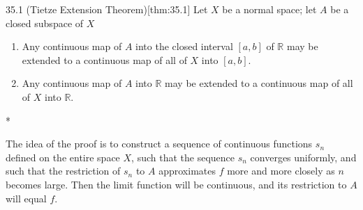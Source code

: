 \begin{thmBox}{35.1 (Tietze Extension Theorem)}[thm:35.1]
Let \( X \) be a normal space; let \( A \) be a closed subspace of \( X \)

\begin{enumerate}[label = (\alph*)]
    \item Any continuous map of \( A \) into the closed interval \( [ a, b ] \) of
        \( \mathbb{R} \) may be extended to a continuous map of all of \( X \) into
        \( [ a, b ] \). 
    \item Any continuous map of \( A \) into \( \mathbb{R} \) may be extended to a 
        continuous map of all of \( X \) into \( \mathbb{R} \). 
\end{enumerate}

\baseRule

\begin{proofBox}*

    The idea of the proof is to construct a sequence of continuous functions 
    \( s_{ n } \) defined on the entire space \( X \), such that the sequence 
    \( s_{ n } \) converges uniformly, and such that the restriction of 
    \( s_{ n } \) to \( A \) approximates \( f \) more and more closely as 
    \( n \) becomes large. 
    Then the limit function will be continuous, and its restriction to \( A \) 
    will equal \( f \). 
    
    \baseSkip


\end{proofBox}
\end{thmBox}
